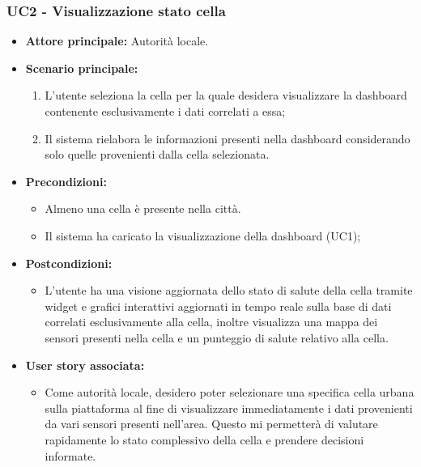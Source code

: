 \subsubsection{UC2 - Visualizzazione stato cella}
\begin{itemize}
    \item \textbf{Attore principale:} Autorità locale.
    \item \textbf{Scenario principale:}
        \begin{enumerate}
            \item L'utente seleziona la cella per la quale desidera visualizzare la dashboard contenente esclusivamente i dati correlati a essa;
            \item Il sistema rielabora le informazioni presenti nella dashboard considerando solo quelle provenienti dalla cella selezionata.
        \end{enumerate}
    \item \textbf{Precondizioni:}
        \begin{itemize}
            \item  Almeno una cella è presente nella città.
            \item Il sistema ha caricato la visualizzazione della dashboard (UC1);
        \end{itemize}
    \item \textbf{Postcondizioni:}
        \begin{itemize}
            \item  L'utente ha una visione aggiornata dello stato di salute della cella tramite widget e grafici interattivi aggiornati in tempo reale sulla base di dati correlati esclusivamente alla cella, inoltre visualizza una mappa dei sensori presenti nella cella e un punteggio di salute relativo alla cella.
          \end{itemize}
    \item \textbf{User story associata:}
        \begin{itemize}
            \item Come autorità locale, desidero poter selezionare una specifica cella urbana sulla piattaforma al fine di visualizzare immediatamente i dati provenienti da vari sensori presenti nell'area. Questo mi permetterà di valutare rapidamente lo stato complessivo della cella e prendere decisioni informate.
        \end{itemize}
\end{itemize}